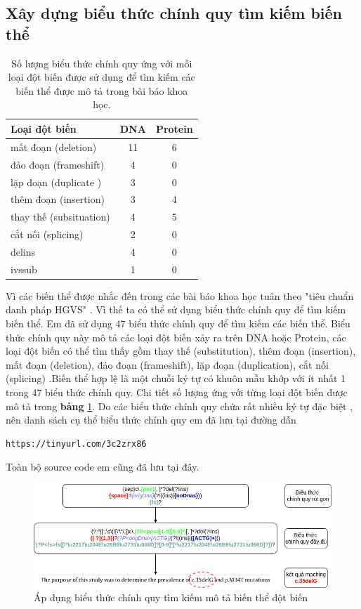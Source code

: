 \documentclass[../DoAn.tex]{subfiles}
\begin{document}
\subsection{Xây dựng biểu thức chính quy tìm kiếm biến thể}
\begin{table}[]
\centering
\caption{Số lượng biểu thức chính quy ứng với mỗi loại đột biến được sử dụng để tìm kiếm các biến thể được mô tả trong bài báo khoa học.}
\label{tab:regextable}
\begin{tabular}{@{}lcc@{}}
\toprule
\textbf{Loại đột biến}         & \textbf{DNA} & \textbf{Protein} \\ \midrule
mất đoạn (deletion)            & 11           & 6                \\
\cmidrule đảo đoạn (frameshift) & 4            & 0                \\
lặp đoạn (duplicate )          & 3            & 0                \\
thêm đoạn (insertion)          & 3            & 4                \\
thay thế (subsituation)        & 4            & 5                \\
cắt nối (splicing)             & 2            & 0                \\
delins                         & 4            & 0                \\
ivssub                         & 1            & 0                \\ \bottomrule
\end{tabular}
\end{table}

Vì các biến thể được nhắc đến trong các bài báo khoa học tuân theo "tiêu chuẩn danh pháp HGVS" \cite{HGVS} . Vì thế ta có thể sử dụng biểu thức chính quy để tìm kiếm biến thể. Em đã sử dụng 47 biểu thức chính quy để tìm kiếm các biến thể. Biểu thức chính quy này mô tả các loại đột biến xảy ra trên DNA hoặc Protein, các loại đột biến có thể tìm thấy gồm thay thế (substitution), thêm đoạn (insertion), mất đoạn (deletion), đảo đoạn (frameshift), lặp đoạn (duplication), cắt nối (splicing) .Biến thể hợp lệ là một chuỗi ký tự có khuôn mẫu khớp với ít nhất 1 trong 47 biểu thức chính quy. Chi tiết số lượng ứng với từng loại đột biến được mô tả trong \textbf{bảng} \ref{tab:regextable}. Do các biểu thức chính quy chứa rất nhiều ký tự đặc biệt , nên danh sách cụ thể biểu thức chính quy em đã lưu tại đường dẫn  \begin{verbatim}https://tinyurl.com/3c2zrx86\end{verbatim} Toàn bộ source code em cũng đã lưu tại đây.

\begin{figure}
\centering
\includegraphics[width=1.1\linewidth]{Hinh_ve/regex.png}
\caption{Áp dụng biểu thức chính quy tìm kiếm mô tả biến thể đột biến}
\label{fig:poppler}
\end{figure}
\end{document}
